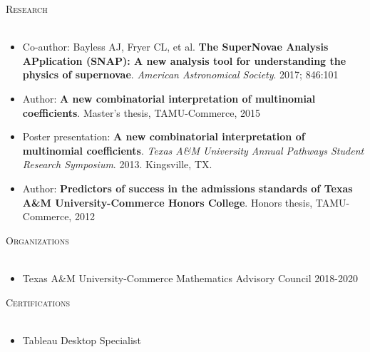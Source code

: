 \documentclass[a4paper]{article}
\newcommand{\lineunder} {
    \vspace*{-8pt} \\
    \hspace*{-18pt} \hrulefill \\
}
\newcommand{\header} [1] {
    {\hspace*{-18pt}\vspace*{6pt} \textsc{#1}}
    \vspace*{-6pt} \lineunder
}
\begin{document}
\header{Research}
\begin{itemize} \itemsep .5pt
	\item Co-author: Bayless AJ, Fryer CL, et al. \textbf{The SuperNovae Analysis APplication (SNAP): A new analysis tool for understanding the physics of supernovae}. \textit{American Astronomical Society}. 2017; 846:101
	\item Author: \textbf{A new combinatorial interpretation of multinomial coefficients}. Master's thesis, TAMU-Commerce, 2015
	\item Poster presentation: \textbf{A new combinatorial interpretation of multinomial coefficients}. \textit{Texas A\&M University Annual Pathways Student Research Symposium}. 2013. Kingsville, TX.
	\item Author: \textbf{Predictors of success in the admissions standards of Texas A\&M University-Commerce Honors College}. Honors thesis, TAMU-Commerce, 2012
\end{itemize}
\vspace{2mm}

\header{Organizations}
\begin{itemize} \itemsep .5pt
	\item Texas A\&M University-Commerce Mathematics Advisory Council 2018-2020
\end{itemize}
\vspace{2mm}

\header{Certifications}
\begin{itemize} \itemsep .5pt
	\item Tableau Desktop Specialist
\end{itemize}
\vspace{2mm}
\ 
\end{document}
